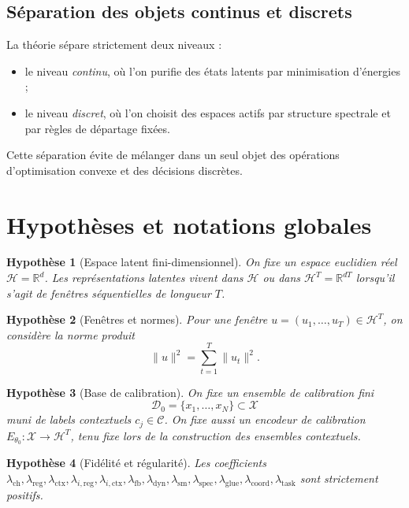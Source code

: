 \documentclass[11pt,a4paper]{article}
\newtheorem{assumption}{Hypothèse}[section]
\newcommand{\X}{\mathcal X}
\newcommand{\C}{\mathcal C}
\newcommand{\D}{\mathcal D}
\newcommand{\Hh}{\mathcal H}
\newcommand{\R}{\mathbb R}
\newcommand{\1}{\mathbf 1}
\begin{document}
\subsection*{Séparation des objets continus et discrets}

La théorie sépare strictement deux niveaux :

\begin{itemize}[leftmargin=2em]
    \item le niveau \emph{continu}, où l'on purifie des états latents par minimisation d'énergies ;
    \item le niveau \emph{discret}, où l'on choisit des espaces actifs par structure spectrale et par règles de départage fixées.
\end{itemize}

Cette séparation évite de mélanger dans un seul objet des opérations d'optimisation convexe et des décisions discrètes.

\section{Hypothèses et notations globales}

\begin{assumption}[Espace latent fini-dimensionnel]
On fixe un espace euclidien réel \(\Hh=\R^d\).  
Les représentations latentes vivent dans \(\Hh\) ou dans \(\Hh^T=\R^{dT}\) lorsqu'il s'agit de fenêtres séquentielles de longueur \(T\).
\end{assumption}

\begin{assumption}[Fenêtres et normes]
Pour une fenêtre \(u=(u_1,\dots,u_T)\in \Hh^T\), on considère la norme produit
\[
\|u\|^2 = \sum_{t=1}^T \|u_t\|^2.
\]
\end{assumption}

\begin{assumption}[Base de calibration]
On fixe un ensemble de calibration fini
\[
\D_0=\{x_1,\dots,x_N\}\subset \X
\]
muni de labels contextuels \(c_j\in\C\).  
On fixe aussi un encodeur de calibration \(E_{\theta_0}:\X\to \Hh^T\), tenu fixe lors de la construction des ensembles contextuels.
\end{assumption}

\begin{assumption}[Fidélité et régularité]
Les coefficients \(\lambda_{\mathrm{ch}},\lambda_{\mathrm{reg}},\lambda_{\mathrm{ctx}},\lambda_{i,\mathrm{reg}},\lambda_{i,\mathrm{ctx}},\lambda_{\mathrm{fb}},\lambda_{\mathrm{dyn}},\lambda_{\mathrm{sm}},\lambda_{\mathrm{spec}},\lambda_{\mathrm{glue}},\lambda_{\mathrm{coord}},\lambda_{\mathrm{task}}\) sont strictement positifs.
\end{assumption}
\end{document}
